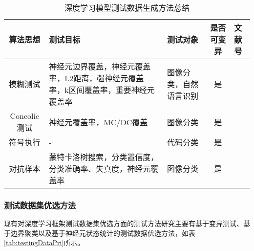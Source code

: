 \begin{table}[t]
	\small
	\centering
	\caption{深度学习模型测试数据生成方法总结}
	\label{tab:testingDataGen}
	\begin{tabular}{cp{5cm}p{2cm}cp{2cm}}
		\toprule
		\textbf{算法思想} & \textbf{测试目标}\centering & \textbf{测试对象} & \textbf{是否可变异} & \textbf{文献号} \\
		\midrule
		模糊测试 & 神经元边界覆盖，神经元覆盖率，L2距离，强神经元覆盖率，k区间覆盖率，重要神经元覆盖率\centering & 图像分类，自然语言识别 & 是 & \cite{Odena2019TensorFuzz,Guo2018DLFuzz,xie2019coverage} \\
		Concolic测试 & 神经元覆盖率，MC/DC覆盖\centering & 图像分类 & 是 & \cite{Sun2018Concolic} \\
		符号执行 & -\centering & 代码分类 & 是 & \cite{Gopinath2018Symbolic} \\
		对抗样本 & 蒙特卡洛树搜索，分类置信度，分类准确率、失真度，神经元覆盖率\centering & 图像分类 & 是 & \cite{Xiao2018Spatially,Wicker2018FeatureGuided,He2018Decision} \\
		\bottomrule
	\end{tabular}
\end{table}





\subsubsection{测试数据集优选方法}

现有对深度学习框架测试数据集优选方面的测试方法研究主要有基于变异测试、基于边界聚类以及基于神经元状态统计的测试数据优选方法，如表\cref{tab:testingDataPri}所示。

